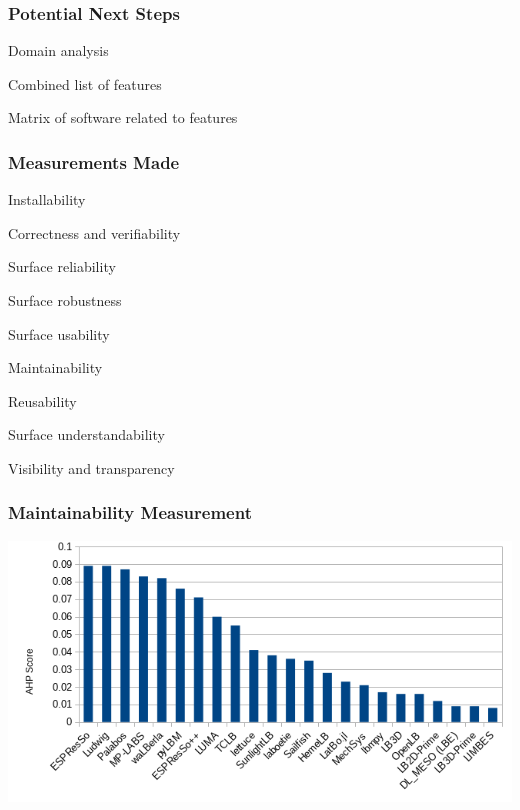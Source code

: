 \documentclass[t,12pt,numbers,fleqn]{beamer}
\begin{document}

\begin{frame}
\frametitle{Potential Next Steps}

\bi
\item {}
  \bi
\item Domain analysis
\item Combined list of features
\item Matrix of software related to features \ei \ei

\end{frame}


\begin{frame}
\frametitle{Measurements Made}

\be
\item Installability
\item Correctness and verifiability
\item Surface reliability
\item Surface robustness
\item Surface usability
\item Maintainability
\item Reusability
\item Surface understandability
\item Visibility and transparency
 \ee
  
\end{frame}


\begin{frame}
\frametitle{Maintainability Measurement}

\bigskip

    \includegraphics[width=1.0\textwidth]{maintainability_chart.png}


    
\end{frame}
\end{document}
